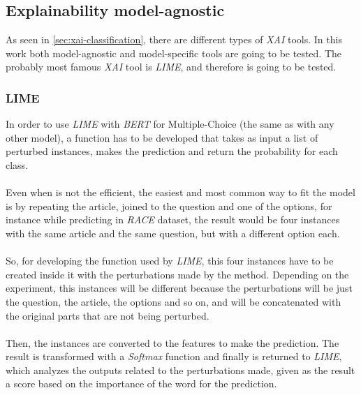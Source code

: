 \subsection{Explainability model-agnostic}
\label{sec:ModelAgnostic}
\noindent As seen in \ref{sec:xai-classification}, there are different types of \emph{XAI} tools. In this work both model-agnostic and model-specific tools are going to be tested. The probably most famous \emph{XAI} tool is \emph{LIME}, and therefore is going to be tested.
\subsubsection{LIME}
\label{sec:Lime}
\noindent In order to use \emph{LIME} with \emph{BERT} for Multiple-Choice (the same as with any other model), a function has to be developed that takes as input a list of perturbed instances, makes the prediction and return the probability for each class. 
\paragraph{}
Even when is not the efficient, the easiest and most common way to fit the model is by repeating the article, joined to the question and one of the options, for instance while predicting in \emph{RACE} dataset, the result would be four instances with the same article and the same question, but with a different option each. 
\paragraph{}
So, for developing the function used by \emph{LIME}, this four instances have to be created inside it with the perturbations made by the method. Depending on the experiment, this instances will be different because the perturbations will be just the question, the article, the options and so on, and will be concatenated with the original parts that are not being perturbed.
\paragraph{}
Then, the instances are converted to the features to make the prediction. The result is transformed with a \emph{Softmax} function and finally is returned to \emph{LIME}, which analyzes the outputs related to the perturbations made, given as the result a score based on the importance of the word for the prediction.
